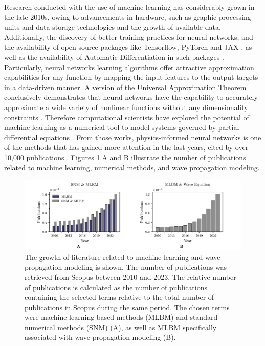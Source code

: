 \documentclass[11pt,twoside]{article}
\begin{document}
Research conducted with the use of machine learning has considerably grown in the late 2010s, owing to advancements 
in hardware, such as graphic processing units and data storage technologies and the growth of available data. 
Additionally, the discovery of better training practices for neural networks, and the availability of open-source 
packages like Tensorflow, PyTorch and JAX \citep{abadi_tensorflow_2016,paszke_pytorch_2019,jax2018github}, as well 
as the availability of Automatic Differentiation in such packages \citep{paszke_automatic_2017,baydin_automatic_2017}. 
Particularly, neural networks learning algorithms offer attractive approximation capabilities for any function by 
mapping the input features to the output targets in a data-driven manner. A version of the Universal Approximation 
Theorem conclusively demonstrates that neural networks have the capability to accurately approximate a wide 
variety of nonlinear functions without any dimensionality constraints \citep{barron_universal_1993}. Therefore 
computational scientists have explored the potential of machine learning as a numerical tool to model systems governed 
by partial differential equations \citep{cuomo_scientific_2022,karniadakis_physics-informed_2021}. From those
works, physics-informed neural networks is one of the methods that has gained more attention in the last years,
cited by over 10,000 publications \citep{Raissi2019}. Figures \ref{fig:publications_absolute_relative}.A and B 
illustrate the number of publications related to machine learning, numerical methods, and wave propagation modeling.

\begin{figure}[H]
\centering
    \includegraphics[width=1.0\textwidth]{figs/publications_year.pdf}
    \caption{The growth of literature related to machine learning and wave propagation modeling is shown. 
    The number of publications was retrieved from Scopus between 2010 and 2023. The relative number of publications 
    is calculated as the number of publications containing the selected terms relative to the total number of 
    publications in Scopus during the same period. The chosen terms were machine learning-based methods (MLBM) 
    and standard numerical methods (SNM) (A), as well as MLBM specifically associated with wave propagation 
    modeling (B).} 
    \label{fig:publications_absolute_relative}
\end{figure}
\end{document}
